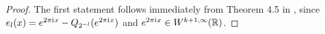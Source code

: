 \begin{proof}
 The first statement follows immediately from Theorem 4.5 in \cite{devore1993constructive}, since $e_l(x) = e^{2\pi {\mathrm{i}\mkern1mu}   x} - Q_{2^{-l}}(e^{2\pi {\mathrm{i}\mkern1mu}   x})$ and $e^{2\pi {\mathrm{i}\mkern1mu} x}\in W^{k+1,\infty}(\mathbb{R})$.
 
%  
%  
%  
 

\end{proof}
